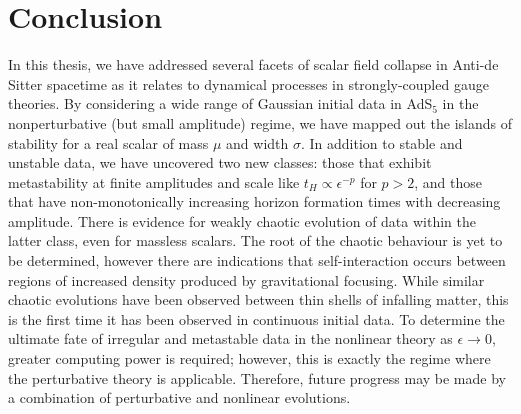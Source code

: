\documentclass[../PhD.tex]{subfiles}
\begin{document}

\chapter{Conclusion}
\label{ch: conclusion}

In this thesis, we have addressed several facets of scalar field collapse in Anti-de Sitter spacetime as it relates to dynamical processes in strongly-coupled gauge theories. By considering a wide range of Gaussian initial data in AdS$_5$ in the nonperturbative (but small amplitude) regime, we have mapped out the islands of stability for a real scalar of mass $\mu$ and width $\sigma$. In addition to stable and unstable data, we have uncovered two new classes: those that exhibit metastability at finite amplitudes and scale like $t_H \propto \epsilon^{-p}$ for $p > 2$, and those that have non-monotonically increasing horizon formation times with decreasing amplitude. There is evidence for weakly chaotic evolution of data within the latter class, even for massless scalars. The root of the chaotic behaviour is yet to be determined, however there are indications that self-interaction occurs between regions of increased density produced by gravitational focusing. While similar chaotic evolutions have been observed between thin shells of infalling matter, this is the first time it has been observed in continuous initial data. To determine the ultimate fate of irregular and metastable data in the nonlinear theory as $\epsilon \to 0$, greater computing power is required; however, this is exactly the regime where the perturbative theory is applicable. Therefore, future progress may be made by a combination of perturbative and nonlinear evolutions.
\end{document}
